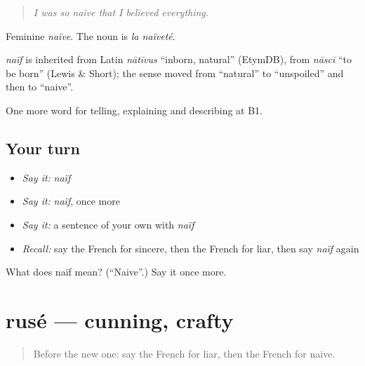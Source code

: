 \begin{quote}
\emph{I was so naive that I believed everything.}
\end{quote}

Feminine \emph{naïve}. The noun is \emph{la naïveté}.

\begin{cousinweb}
\emph{naïf} is inherited from Latin \emph{nātīvus} \textquotedblleft{}inborn, natural\textquotedblright{} (EtymDB), from \emph{nāscī} \textquotedblleft{}to be born\textquotedblright{} (Lewis \& Short); the sense moved from \textquotedblleft{}natural\textquotedblright{} to \textquotedblleft{}unspoiled\textquotedblright{} and then to \textquotedblleft{}naive\textquotedblright{}.
\end{cousinweb}

\begin{grammarlens}[title={What you've built}]
One more word for telling, explaining and describing at B1.
\end{grammarlens}

\subsection*{Your turn}
\begin{itemize}
\raggedright
  \item \emph{Say it:} \emph{naïf}
  \item \emph{Say it:} \emph{naïf}, once more
  \item \emph{Say it:} a sentence of your own with \emph{naïf}
  \item \emph{Recall:} say the French for sincere, then the French for liar, then say \emph{naïf} again
\end{itemize}

\begin{tcolorbox}[breakable,colback=teal!4,colframe=teal!35!black,title={Before you move on}]
What does naïf mean? (\textquotedblleft{}Naive\textquotedblright{}.) Say it once more.
\end{tcolorbox}
\section[rusé]{rusé — cunning, crafty}

\label{lesson:FR-C468-ruse}



\begin{quote}
Before the new one: say the French for liar, then the French for naive.
\end{quote}

